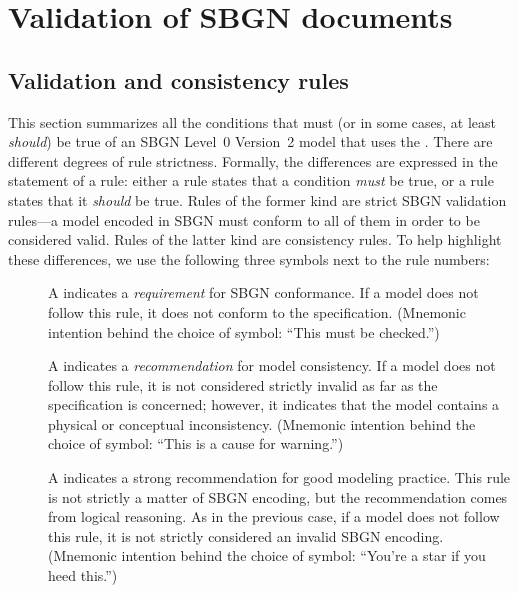 
\section{Validation of SBGN documents}
\label{apdx-validation}

\subsection{Validation and consistency rules}
\label{validation-rules}

This section summarizes all the conditions that must (or in some cases,
at least \emph{should}) be true of an SBGN Level~0 Version~2 model that
uses the \SystemsBiologyGraphicalNotationMarkupLanguagePackage. There are different degrees of
rule strictness. Formally, the differences are expressed in the
statement of a rule: either a rule states that a condition \emph{must}
be true, or a rule states that it \emph{should} be true. Rules of the
former kind are strict SBGN validation rules---a model encoded in SBGN
must conform to all of them in order to be considered valid. Rules of
the latter kind are consistency rules. To help highlight these
differences, we use the following three symbols next to the rule
numbers:

\begin{description}

\item[\hspace*{6.5pt}\vSymbol\vsp] A \vSymbolName indicates a
\emph{requirement} for SBGN conformance. If a model does not follow this
rule, it does not conform to the
\SystemsBiologyGraphicalNotationMarkupLanguagePackage specification.
(Mnemonic intention behind the choice of symbol: ``This must be
checked.'')

\item[\hspace*{6.5pt}\cSymbol\csp] A \cSymbolName indicates a
\emph{recommendation} for model consistency. If a model does not follow
this rule, it is not considered strictly invalid as far as the
\SystemsBiologyGraphicalNotationMarkupLanguagePackage specification is
concerned; however, it indicates that the model contains a physical or
conceptual inconsistency. (Mnemonic intention behind the choice of
symbol: ``This is a cause for warning.'')

\item[\hspace*{6.5pt}\mSymbol\msp] A \mSymbolName indicates a strong
recommendation for good modeling practice. This rule is not strictly a
matter of SBGN encoding, but the recommendation comes from logical
reasoning. As in the previous case, if a model does not follow this
rule, it is not strictly considered an invalid SBGN encoding. (Mnemonic
intention behind the choice of symbol: ``You're a star if you heed
this.'')

\end{description}

